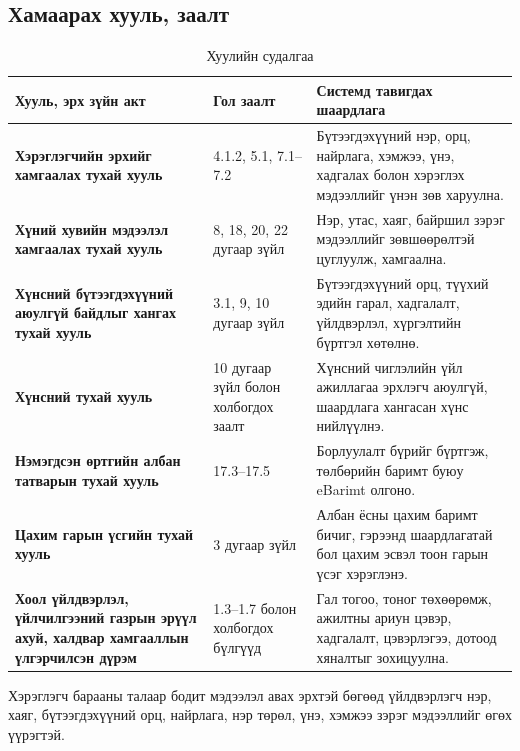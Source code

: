 \subsection{Хамаарах хууль, заалт}
\begin{table}
    \centering
    \begin{tabular}{p{4cm}p{4.5cm}p{5.5cm}}
\toprule
\textbf{Хууль, эрх зүйн акт} &
\textbf{Гол заалт} &
\textbf{Системд тавигдах шаардлага} \\
\midrule

\textbf{Хэрэглэгчийн эрхийг хамгаалах тухай хууль} &
4.1.2, 5.1, 7.1--7.2 &
Бүтээгдэхүүний нэр, орц, найрлага, хэмжээ, үнэ, хадгалах болон
хэрэглэх мэдээллийг үнэн зөв харуулна. \\

\textbf{Хүний хувийн мэдээлэл хамгаалах тухай хууль} &
8, 18, 20, 22 дугаар зүйл &
Нэр, утас, хаяг, байршил зэрэг мэдээллийг зөвшөөрөлтэй цуглуулж,
хамгаална. \\

\textbf{Хүнсний бүтээгдэхүүний аюулгүй байдлыг хангах тухай хууль} &
3.1, 9, 10 дугаар зүйл &
Бүтээгдэхүүний орц, түүхий эдийн гарал, хадгалалт, үйлдвэрлэл, хүргэлтийн
бүртгэл хөтөлнө. \\

\textbf{Хүнсний тухай хууль} &
10 дугаар зүйл болон холбогдох заалт &
Хүнсний чиглэлийн үйл ажиллагаа эрхлэгч аюулгүй, шаардлага хангасан
хүнс нийлүүлнэ. \\

\textbf{Нэмэгдсэн өртгийн албан татварын тухай хууль} &
17.3--17.5 &
Борлуулалт бүрийг бүртгэж, төлбөрийн баримт буюу eBarimt олгоно. \\

\textbf{Цахим гарын үсгийн тухай хууль} &
3 дугаар зүйл &
Албан ёсны цахим баримт бичиг, гэрээнд шаардлагатай бол цахим эсвэл
тоон гарын үсэг хэрэглэнэ. \\

\textbf{Хоол үйлдвэрлэл, үйлчилгээний газрын эрүүл ахуй, халдвар
хамгааллын үлгэрчилсэн дүрэм} &
1.3--1.7 болон холбогдох бүлгүүд &
Гал тогоо, тоног төхөөрөмж, ажилтны ариун цэвэр, хадгалалт,
цэвэрлэгээ, дотоод хяналтыг зохицуулна. \\

\bottomrule
        
    \end{tabular}
    \caption{Хуулийн судалгаа}
    \label{tab:laws}
\end{table}

Хэрэглэгч барааны талаар бодит мэдээлэл авах эрхтэй бөгөөд үйлдвэрлэгч нэр, хаяг, бүтээгдэхүүний орц, найрлага, нэр төрөл, үнэ, хэмжээ зэрэг мэдээллийг өгөх үүрэгтэй.


